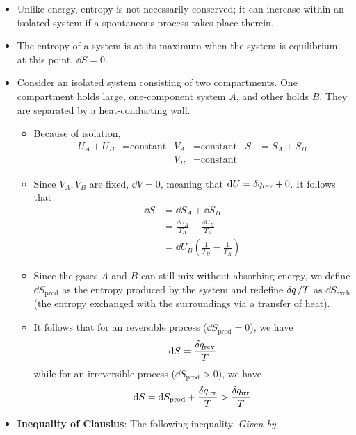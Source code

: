 \documentclass[../notes.tex]{subfiles}
\begin{document}
\begin{itemize}
    \item Unlike energy, entropy is not necessarily conserved; it can increase within an isolated system if a spontaneous process takes place therein.
    \item The entropy of a system is at its maximum when the system is equilibrium; at this point, $\dd{S}=0$.
    \item Consider an isolated system consisting of two compartments. One compartment holds large, one-component system $A$, and other holds $B$. They are separated by a heat-conducting wall.
    \begin{itemize}
        \item Because of isolation,
        \begin{align*}
            U_A+U_B &= \text{constant}&
                V_A &= \text{constant}&
                    S &= S_A+S_B\\
            &&
                V_B &= \text{constant}
        \end{align*}
        \item Since $V_A,V_B$ are fixed, $\dd{V}=0$, meaning that $\dd{U}=\var{q_\text{rev}}+0$. It follows that
        \begin{align*}
            \dd{S} &= \dd{S_A}+\dd{S_B}\\
            &= \frac{\dd{U_A}}{T_A}+\frac{\dd{U_B}}{T_B}\\
            &= \dd{U_B}\left( \frac{1}{T_B}-\frac{1}{T_A} \right)
        \end{align*}
        \item Since the gases $A$ and $B$ can still mix without absorbing energy, we define $\dd{S_\text{prod}}$ as the entropy produced by the system and redefine $\var{q}/T$ as $\dd{S_\text{exch}}$ (the entropy exchanged with the surroundings via a transfer of heat).
        \item It follows that for an reversible process ($\dd{S_\text{prod}}=0$), we have
        \begin{equation*}
            \dd{S} = \frac{\var{q_\text{rev}}}{T}
        \end{equation*}
        while for an irreversible process ($\dd{S_\text{prod}}>0$), we have
        \begin{equation*}
            \dd{S} = \dd{S_\text{prod}}+\frac{\var{q_\text{irr}}}{T} > \frac{\var{q_\text{irr}}}{T}
        \end{equation*}
    \end{itemize}
    \item \textbf{Inequality of Clausius}: The following inequality. \emph{Given by}

\end{itemize}
\end{document}
